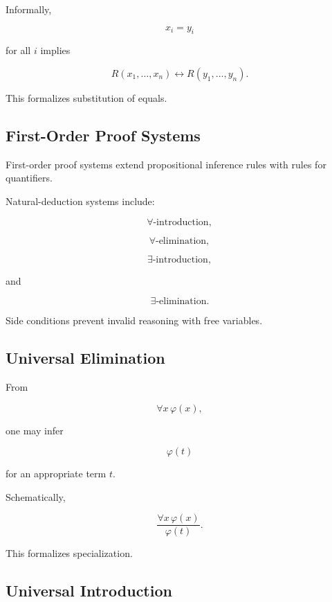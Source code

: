 Informally,

\[
x_i=y_i
\]

for all \(i\) implies

\[
\boxed{
R(x_1,\ldots,x_n)
\leftrightarrow
R(y_1,\ldots,y_n).
}
\]

This formalizes substitution of equals.

\subsection{First-Order Proof Systems}
\label{subsec:first-order-proof-systems}

First-order proof systems extend propositional inference rules with rules
for quantifiers.

Natural-deduction systems include:

\[
\boxed{
\forall\text{-introduction},
}
\]

\[
\boxed{
\forall\text{-elimination},
}
\]

\[
\boxed{
\exists\text{-introduction},
}
\]

and

\[
\boxed{
\exists\text{-elimination}.
}
\]

Side conditions prevent invalid reasoning with free variables.

\subsection{Universal Elimination}
\label{subsec:universal-elimination}

From

\[
\forall x\,\varphi(x),
\]

one may infer

\[
\boxed{
\varphi(t)
}
\]

for an appropriate term \(t\).

Schematically,

\[
\boxed{
\frac{
\forall x\,\varphi(x)
}{
\varphi(t)
}.
}
\]

This formalizes specialization.

\subsection{Universal Introduction}
\label{subsec:universal-introduction}

